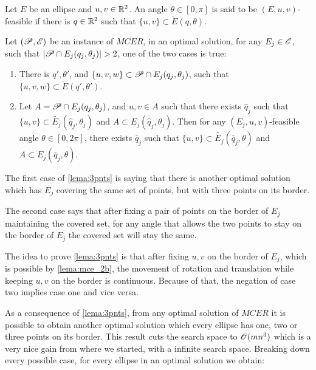 \begin{definicao}\label{def:feasible_angle}
	Let $E$ be an ellipse and $u, v \in \mathbb{R}^2$. An angle $\theta \in [0, \pi]$ is said to be $(E, u, v)$-feasible if there is $q \in \mathbb{R}^2$ such that $\{u, v\} \subset \tilde{E}(q, \theta)$.
\end{definicao}

\begin{lema}\label{lema:3pnts}
	Let $(\mathscr{P}, \mathscr{E})$ be an instance of $MCER$, in an optimal solution, for any $E_j \in \mathscr{E}$, such that $|\Pp \cap E_j(q_j, \theta_j)|>2$, one of the two cases is true:
	
	\begin{enumerate}
		\item There is $q', \theta'$, and $\{u, v, w\} \subset \mathscr{P} \cap E_j(q_j, \theta_j)$, such that $\{u, v, w\} \subset \tilde{E}(q', \theta')$.
		
		\item Let $A=\mathscr{P} \cap E_j(q_j, \theta_j)$, and $u, v \in A$ such that there exists $\hat{q}_j$ such that $\{u, v\} \subset \tilde{E_j}(\hat{q}_j, \theta_j)$ and $A \subset E_j(\hat{q}_j, \theta_j)$. Then for any $(E_j, u, v)$-feasible angle $\theta \in [0, 2\pi]$, there exists $\bar{q}_j$ such that $\{u, v\} \subset \tilde{E_j}(\bar{q}_j, \theta)$ and $A \subset E_j(\bar{q}_j, \theta)$.
	\end{enumerate}
\end{lema}

The first case of \autoref{lema:3pnts} is saying that there is another optimal solution which has $E_j$ covering the same set of points, but with three points on its border. 

The second case says that after fixing a pair of points on the border of $E_j$ maintaining the covered set, for any angle that allows the two points to stay on the border of $E_j$ the covered set will stay the same.

The idea to prove \autoref{lema:3pnts} is that after fixing $u, v$ on the border of $E_j$, which is possible by \autoref{lema:mce_2b}, the movement of rotation and translation while keeping $u, v$ on the border is continuous. Because of that, the negation of case two implies case one and vice versa.


As a consequence of \autoref{lema:3pnts}, from any optimal solution of $MCER$ it is possible to obtain another optimal solution which every ellipse has one, two or three points on its border.
This result cuts the search space to $\mathscr{O}(mn^3)$ which is a very nice gain from where we started, with a infinite search space. Breaking down every possible case, for every ellipse in an optimal solution we obtain:

